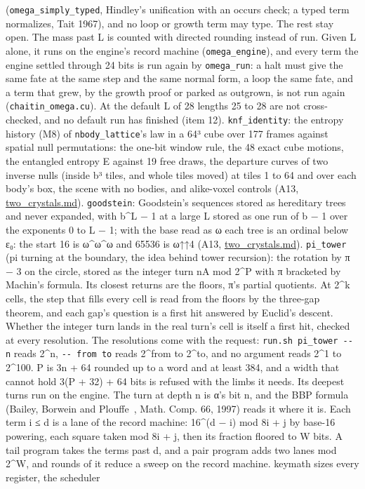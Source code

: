 \begin{description}
(\texttt{omega\_\allowbreak{}simply\_\allowbreak{}typed}, Hindley's unification with an occurs check; a typed term normalizes, Tait 1967), and no loop or growth term may type. The rest stay open. The mass past L is counted with directed rounding instead of run. Given L alone, it runs on the engine's record machine (\texttt{omega\_\allowbreak{}engine}), and every term the engine settled through 24 bits is run again by \texttt{omega\_\allowbreak{}run}: a halt must give the same fate at the same step and the same normal form, a loop the same fate, and a term that grew, by the growth proof or parked as outgrown, is not run again (\texttt{chaitin\_\allowbreak{}omega.\allowbreak{}cu}). At the default L of 28 lengths 25 to 28 are not cross-checked, and no default run has finished (item 12). \texttt{knf\_\allowbreak{}identity}: the entropy history (M8) of \texttt{nbody\_\allowbreak{}lattice}'s law in a 64³ cube over 177 frames against spatial null permutations: the one-bit window rule, the 48 exact cube motions, the entangled entropy E against 19 free draws, the departure curves of two inverse nulls (inside b³ tiles, and whole tiles moved) at tiles 1 to 64 and over each body's box, the scene with no bodies, and alike-voxel controls (A13, \hyperref[chap:two-crystals]{two\_\allowbreak{}crystals.md}). \texttt{goodstein}: Goodstein's sequences stored as hereditary trees and never expanded, with b\textasciicircum{}L − 1 at a large L stored as one run of b − 1 over the exponents 0 to L − 1; with the base read as ω each tree is an ordinal below ε₀: the start 16 is ω\textasciicircum{}ω\textasciicircum{}ω and 65536 is ω↑↑4 (A13, \hyperref[chap:two-crystals]{two\_\allowbreak{}crystals.md}). \texttt{pi\_\allowbreak{}tower} (pi turning at the boundary, the idea behind tower recursion): the rotation by π − 3 on the circle, stored as the integer turn nA mod 2\textasciicircum{}P with π bracketed by Machin's formula. Its closest returns are the floors, π's partial quotients. At 2\textasciicircum{}k cells, the step that fills every cell is read from the floors by the three-gap theorem, and each gap's question is a first hit answered by Euclid's descent. Whether the integer turn lands in the real turn's cell is itself a first hit, checked at every resolution. The resolutions come with the request: \texttt{run.\allowbreak{}sh pi\_\allowbreak{}tower -\allowbreak{}-\allowbreak{} n} reads 2\textasciicircum{}n, \texttt{-\allowbreak{}-\allowbreak{} from to} reads 2\textasciicircum{}from to 2\textasciicircum{}to, and no argument reads 2\textasciicircum{}1 to 2\textasciicircum{}100. P is 3n + 64 rounded up to a word and at least 384, and a width that cannot hold 3(P + 32) + 64 bits is refused with the limbs it needs. Its deepest turns run on the engine. The turn at depth n is α's bit n, and the BBP formula (Bailey, Borwein and Plouffe~\cite{src:Bailey-Borwein-and-Plouffe-1997}, Math. Comp. 66, 1997) reads it where it is. Each term i ≤ d is a lane of the record machine: 16\textasciicircum{}(d − i) mod 8i + j by base-16 powering, each square taken mod 8i + j, then its fraction floored to W bits. A tail program takes the terms past d, and a pair program adds two lanes mod 2\textasciicircum{}W, and rounds of it reduce a sweep on the record machine. keymath sizes every register, the scheduler 
\end{description}
